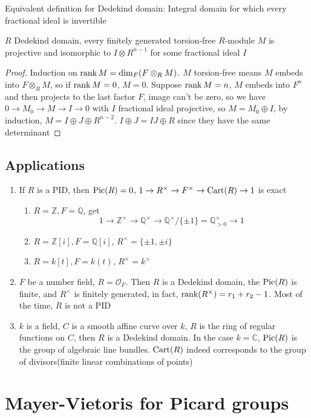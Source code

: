 \documentclass[main]{subfiles}
\begin{document}
Equivalent definition for Dedekind domain: Integral domain for which every fractional ideal is invertible

\begin{theorem}
$R$ Dedekind domain, every finitely generated torsion-free $R$-module $M$ is projective and isomorphic to $I\otimes R^{n-1}$ for some fractional ideal $I$
\end{theorem}

\begin{proof}
Induction on $\operatorname{rank} M=\dim_F(F\otimes_RM)$. $M$ torsion-free means $M$ embeds into $F\otimes_RM$, so if $\operatorname{rank} M=0$, $M=0$. Suppose $\operatorname{rank} M=n$, $M$ embeds into $F^n$ and then projects to the last factor $F$, image can't be zero, so we have $0\to M_0\to M\to I\to0$ with $I$ fractional ideal projective, so $M=M_0\oplus I$, by induction, $M=I\oplus J\oplus R^{n-2}$. $I\oplus J=IJ\oplus R$ since they have the same determinant
\end{proof}

\subsection{Applications}
\begin{enumerate}
\item If $R$ is a PID, then $\operatorname{Pic}(R)=0$,  $1\to R^\times\to F^\times\to \operatorname{Cart}(R)\to1$ is exact
\begin{enumerate}
\item $R=\mathbb Z,F=\mathbb Q$, get
\[1\to\mathbb Z^\times\to\mathbb Q^\times\to\mathbb Q^\times/\{\pm1\}=\mathbb Q^\times_{>0}\to1\]
\item $R=\mathbb Z[i],F=\mathbb Q[i]$, $R^\times=\{\pm1,\pm i\}$
\item $R=k[t], F=k(t)$, $R^\times=k^\times$
\end{enumerate}
\item $F$ be a number field, $R=\mathcal O_F$. Then $R$ is a Dedekind domain, the $\operatorname{Pic}(R)$ is finite, and $R^\times$ is finitely generated, in fact, $\operatorname{rank}(R^\times)=r_1+r_2-1$. Most of the time, $R$ is not a PID
\item $k$ is a field, $C$ is a smooth affine curve over $k$, $R$ is the ring of regular functions on $C$, then $R$ is a Dedekind domain. In the case $k=\mathbb C$, $\operatorname{Pic}(R)$ is the group of algebraic line bundles. $\operatorname{Cart}(R)$ indeed corresponds to the group of divisors(finite linear combinations of points)
\end{enumerate}

\section{Mayer-Vietoris for Picard groups}
\end{document}
